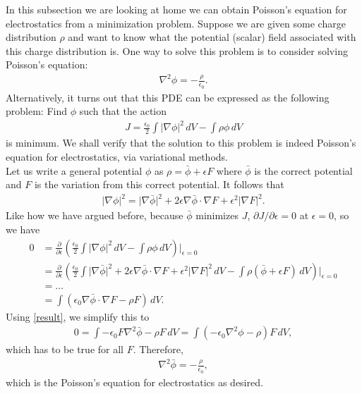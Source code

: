 \documentclass{article}
\newcommand{\p}{\partial}
\newcommand{\f}[2]{\frac{#1}{#2}}
\newcommand{\lp}{\left(}
\newcommand{\rp}{\right)}
\begin{document}
In this subsection we are looking at home we can obtain Poisson's equation for electrostatics from a minimization problem. Suppose we are given some charge distribution $\rho$ and want to know what the potential (scalar) field associated with this charge distribution is. One way to solve this problem is to consider solving Poisson's equation:
\begin{align}
\nabla^2 \phi = -\f{\rho}{\epsilon_0}.
\end{align}
Alternatively, it turns out that this PDE can be expressed as the following problem: Find $\phi$ such that the action
\begin{align}\label{poisson}
J = \f{\epsilon_0}{2}\int \vert \nabla \phi\vert^2 \,dV - \int \rho \phi \,dV 
\end{align}
is minimum. We shall verify that the solution to this problem is indeed Poisson's equation for electrostatics, via variational methods. \\


Let us write a general potential $\phi$ as $\rho = \bar{\phi} + \epsilon F$ where $\bar{\phi}$ is the correct potential and $F$ is the variation from this correct potential. It follows that
\begin{align}
\vert \nabla \phi \vert^2 = \vert \nabla \bar{\phi} \vert^2 + 2\epsilon \nabla \bar{\phi}\cdot  \nabla F  + \epsilon^2\vert \nabla F \vert^2.
\end{align}
Like how we have argued before, because $\bar{\phi}$ minimizes $J$, $\p J/\p \epsilon = 0$ at $\epsilon = 0$, so we have
\begin{align}
0 &= \f{\p}{\p \epsilon}\lp \f{\epsilon_0}{2}\int \vert \nabla \phi\vert^2 \,dV - \int \rho \phi \,dV  \rp \bigg\vert_{\epsilon=0} \nonumber\\
&= \f{\p}{\p \epsilon}\lp \f{\epsilon_0}{2}\int \vert \nabla \bar{\phi} \vert^2 + 2\epsilon \nabla \bar{\phi}\cdot \nabla F + \epsilon^2\vert \nabla F \vert^2 \,dV - \int \rho (\bar{\phi} + \epsilon F) \,dV  \rp \bigg\vert_{\epsilon=0}\nonumber\\
&= \dots\nonumber\\
&= \int \lp\epsilon_0 \nabla \bar{\phi}\cdot \nabla F - \rho F\rp\,dV.
\end{align}
Using \eqref{result}, we simplify this to
\begin{align}
0 = \int -\epsilon_0F\nabla^2\bar{\phi} - \rho F \,dV = \int (-\epsilon_0\nabla^2 \phi - \rho )F\,dV,
\end{align}
which has to be true for all $F$. Therefore, 
\begin{align}
\nabla^2\bar{\phi} = -\f{\rho}{\epsilon_0},
\end{align}
which is the Poisson's equation for electrostatics as desired. \cite{FEYN} 
\end{document}

